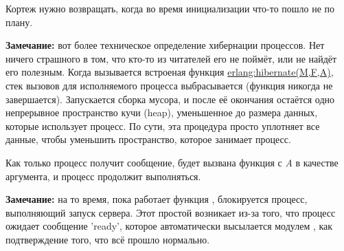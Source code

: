 Кортеж  нужно возвращать, когда во время инициализации что\--то пошло не по плану.

\colorbox{lgray}
{
\begin{minipage}{1.0\linewidth}
    \textbf{Замечание:} вот более техническое определение хибернации процессов.
    Нет ничего страшного в том, что кто\--то из читателей его не поймёт, или не найдёт его полезным.
    Когда вызывается встроеная функция \href{http://erldocs.com/R15B/erts/erlang.html\#hibernate/3}{erlang:hibernate(M,F,A)}, стек вызовов для исполняемого процесса выбрасывается (функция никогда не завершается).
    Запускается сборка мусора, и после её окончания остаётся одно непрерывное пространство кучи (heap), уменьшенное до размера данных, которые использует процесс.
    По сути, эта процедура просто уплотняет все данные, чтобы уменьшить пространство, которое занимает процесс.

    Как только процесс получит сообщение, будет вызвана функция  с \emph{A} в качестве аргумента, и процесс продолжит выполняться.
\end{minipage}
}

\colorbox{lgray}
{
\begin{minipage}{1.0\linewidth}
    \textbf{Замечание:} на то время, пока работает функция , блокируется процесс, выполняющий запуск сервера.
    Этот простой возникает из\--за того, что процесс ожидает сообщение 'ready', которое автоматически высылается модулем , как подтверждение того, что всё прошло нормально.
\end{minipage}
}

